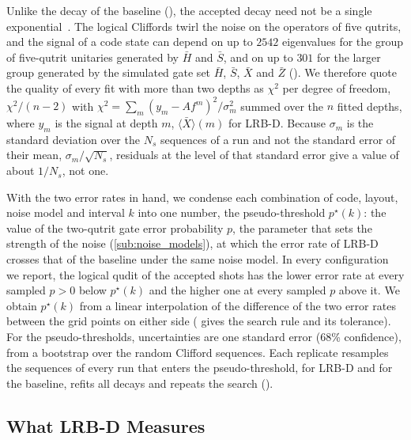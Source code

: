 Unlike the decay of the baseline (), the accepted decay need not be a single exponential~\cite{Ceasura2022}. The logical Cliffords twirl the noise on the operators of five qutrits, and the signal of a code state can depend on up to $2542$ eigenvalues for the group of five-qutrit unitaries generated by $\bar H$ and $\bar S$, and on up to $301$ for the larger group generated by the simulated gate set $\bar H$, $\bar S$, $\bar X$ and $\bar Z$ (). We therefore quote the quality of every fit with more than two depths as $\chi^2$ per degree of freedom, $\chi^2/(n-2)$ with $\chi^2 = \sum_m (y_m - A f^m)^2/\sigma_m^2$ summed over the $n$ fitted depths, where $y_m$ is the signal at depth $m$, $\langle \bar X \rangle(m)$ for LRB-D. Because $\sigma_m$ is the standard deviation over the $N_s$ sequences of a run and not the standard error of their mean, $\sigma_m/\sqrt{N_s}$, residuals at the level of that standard error give a value of about $1/N_s$, not one.

With the two error rates in hand, we condense each combination of code, layout, noise model and interval $k$ into one number, the pseudo-threshold $p^\star(k)$: the value of the two-qutrit gate error probability $p$, the parameter that sets the strength of the noise (\autoref{sub:noise_models}), at which the error rate of LRB-D crosses that of the baseline under the same noise model. In every configuration we report, the logical qudit of the accepted shots has the lower error rate at every sampled $p > 0$ below $p^\star(k)$ and the higher one at every sampled $p$ above it. We obtain $p^\star(k)$ from a linear interpolation of the difference of the two error rates between the grid points on either side ( gives the search rule and its tolerance). For the pseudo-thresholds, uncertainties are one standard error (68\% confidence), from a bootstrap over the random Clifford sequences. Each replicate resamples the sequences of every run that enters the pseudo-threshold, for LRB-D and for the baseline, refits all decays and repeats the search ().

\subsection{What LRB-D Measures}
\label{sub:lrbd_measures}

